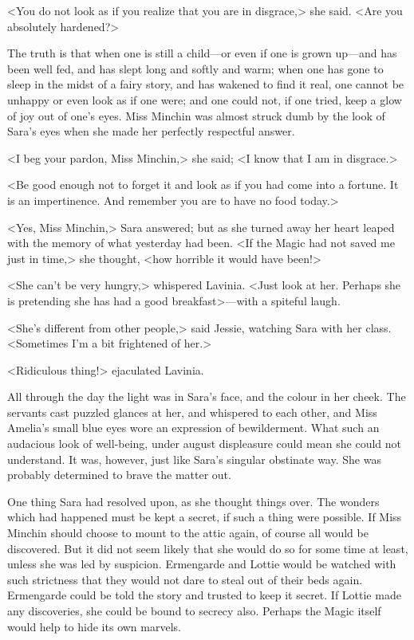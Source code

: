 <You do not look as if you realize that you are in disgrace,> she said. <Are you absolutely hardened?>

The truth is that when one is still a child—or even if one is grown up—and has been well fed, and has slept long and softly and warm; when one has gone to sleep in the midst of a fairy story, and has wakened to find it real, one cannot be unhappy or even look as if one were; and one could not, if one tried, keep a glow of joy out of one's eyes. Miss Minchin was almost struck dumb by the look of Sara's eyes when she made her perfectly respectful answer.

<I beg your pardon, Miss Minchin,> she said; <I know that I am in disgrace.>

<Be good enough not to forget it and look as if you had come into a fortune. It is an impertinence. And remember you are to have no food today.>

<Yes, Miss Minchin,> Sara answered; but as she turned away her heart leaped with the memory of what yesterday had been. <If the Magic had not saved me just in time,> she thought, <how horrible it would have been!>

<She can't be very hungry,> whispered Lavinia. <Just look at her. Perhaps she is pretending she has had a good breakfast>—with a spiteful laugh.

<She's different from other people,> said Jessie, watching Sara with her class. <Sometimes I'm a bit frightened of her.>

<Ridiculous thing!> ejaculated Lavinia.

All through the day the light was in Sara's face, and the colour in her cheek. The servants cast puzzled glances at her, and whispered to each other, and Miss Amelia's small blue eyes wore an expression of bewilderment. What such an audacious look of well-being, under august displeasure could mean she could not understand. It was, however, just like Sara's singular obstinate way. She was probably determined to brave the matter out.

One thing Sara had resolved upon, as she thought things over. The wonders which had happened must be kept a secret, if such a thing were possible. If Miss Minchin should choose to mount to the attic again, of course all would be discovered. But it did not seem likely that she would do so for some time at least, unless she was led by suspicion. Ermengarde and Lottie would be watched with such strictness that they would not dare to steal out of their beds again. Ermengarde could be told the story and trusted to keep it secret. If Lottie made any discoveries, she could be bound to secrecy also. Perhaps the Magic itself would help to hide its own marvels.

